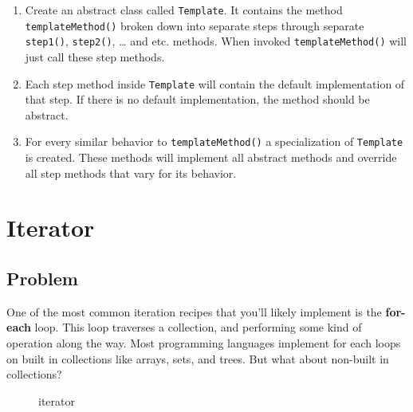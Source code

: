 \begin{enumerate}
\def\labelenumi{\arabic{enumi}.}
\tightlist
\item
  Create an abstract class called \texttt{Template}. It contains the
  method \texttt{templateMethod()} broken down into separate steps
  through separate \texttt{step1()}, \texttt{step2()}, \ldots{} and etc.
  methods. When invoked \texttt{templateMethod()} will just call these
  step methods.
\item
  Each step method inside \texttt{Template} will contain the default
  implementation of that step. If there is no default implementation,
  the method should be abstract.
\item
  For every similar behavior to \texttt{templateMethod()} a
  specialization of \texttt{Template} is created. These methods will
  implement all abstract methods and override all step methods that vary
  for its behavior.
\end{enumerate}

\section{Iterator}\label{behavioral-patterns.md__iterator}

\subsection{Problem}\label{behavioral-patterns.md__problem-5}

One of the most common iteration recipes that you'll likely implement is
the \textbf{for-each} loop. This loop traverses a collection, and
performing some kind of operation along the way. Most programming
languages implement for each loops on built in collections like arrays,
sets, and trees. But what about non-built in collections?

\begin{figure}
\centering
{}
\caption{iterator}
\end{figure}

